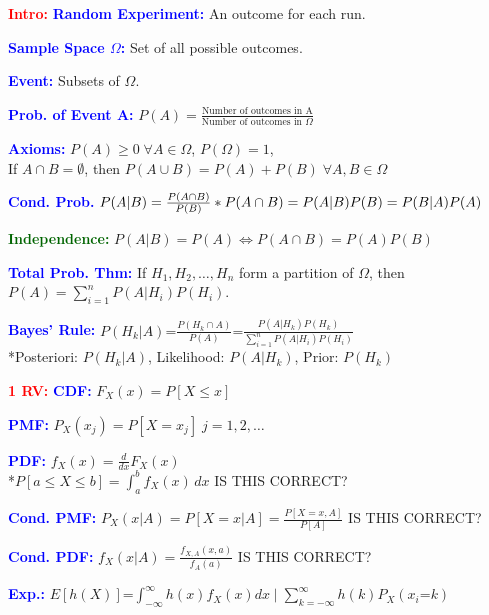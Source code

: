 \documentclass[5pt]{extarticle} %
\begin{document}
\begin{paracol}{3}
    {\tiny
    \textcolor{red}{\textbf{Intro:}} \textcolor{blue}{\textbf{Random Experiment:}} An outcome for each run.  

    \textcolor{blue}{\textbf{Sample Space $\Omega$:}} Set of all possible outcomes.

    \textcolor{blue}{\textbf{Event:}} Subsets of $\Omega$.

    \textcolor{blue}{\textbf{Prob. of Event A:}} $P(A) = \frac{\text{Number of outcomes in A}}{\text{Number of outcomes in } \Omega}$

    \textcolor{blue}{\textbf{Axioms:}} $P(A) \geq 0 \; \forall A \in \Omega$, $P(\Omega) = 1$, \\
    If $A \cap B = \emptyset$, then $P(A \cup B) = P(A) + P(B) \; \forall A, B \in \Omega$

    \textcolor{blue}{\textbf{Cond. Prob.}} $P(A|B) = \frac{P(A \cap B)}{P(B)} \\
    *P(A \cap B) = P(A|B) P(B) = P(B|A) P(A)$

    \textcolor{darkgreen}{\textbf{Independence:}} $P(A|B) = P(A) \Leftrightarrow P(A \cap B) = P(A) P(B)$

    \textcolor{blue}{\textbf{Total Prob. Thm:}} If $H_1, H_2, \ldots, H_n$ form a partition of $\Omega$, then $P(A) = \sum_{i=1}^n P(A|H_i) P(H_i)$.

    \textcolor{blue}{\textbf{Bayes' Rule:}} $P(H_k|A) \text{=} \frac{P(H_k \cap A)}{P(A)} \text{=} \frac{P(A|H_k) P(H_k)}{\sum_{i=1}^n P(A|H_i) P(H_i)}$ \\
    *Posteriori: $P(H_k|A)$, Likelihood: $P(A|H_k)$, Prior: $P(H_k)$ 

    \textcolor{red}{\textbf{1 RV:}} \textcolor{blue}{\textbf{CDF:}} $F_X(x) = P[X \leq x]$ 

    \textcolor{blue}{\textbf{PMF:}} $P_X(x_j) = P[X = x_j] \; j=1,2,\ldots$

    \textcolor{blue}{\textbf{PDF:}} $f_X(x) = \frac{d}{dx} F_X(x)$ \\
    *$P[a \leq X \leq b] = \int_a^b f_X(x) \, dx$ IS THIS CORRECT?

    \textcolor{blue}{\textbf{Cond. PMF:}} $P_X(x|A) = P[X = x|A] = \frac{P[X = x, A]}{P[A]}$ IS THIS CORRECT?

    \textcolor{blue}{\textbf{Cond. PDF:}} $f_{X}(x|A) = \frac{f_{X,A}(x, a)}{f_A(a)}$ IS THIS CORRECT?

    \textcolor{blue}{\textbf{Exp.:}} $E[h(X)] \text{=} \int_{-\infty}^{\infty} h(x) f_X(x) dx \mid \sum_{k=-\infty}^{\infty} h(k) P_X(x_i \text{=} k)$ \\

}
\end{paracol}
\end{document}
